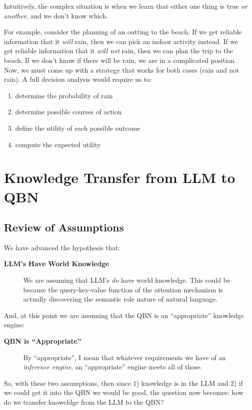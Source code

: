 \documentclass[12pt]{article}
\begin{document}
Intuitively, the complex situation is when we learn that either one thing is true {\em or another}, and we don't know which.

For example, consider the planning of an outting to the beach.
If we get reliable information that it {\em will} rain, then we can pick an indoor activity instead.
If we get reliable information that it {\em will not} rain, then we can plan the trip to the beach.
If we don't know if there will be rain, we are in a complicated position.
Now, we must come up with a strategy that works for both cases (rain and not rain).
A full decision analysis would require us to:
\begin{enumerate}
    \item determine the probability of rain
    \item determine possible courses of action
    \item define the utility of each possible outcome
    \item compute the expected utility
\end{enumerate}
\section{Knowledge Transfer from LLM to QBN}
\subsection{Review of Assumptions}
We have advanced the hypothesis that:
\begin{description}
    \item[\textbf{LLM's Have World Knowledge}] We are assuming that LLM's {\em do} have world knowledge. This could be because the query-key-value function of the attention mechanism is actually discovering the semantic role nature of natural language.
  \end{description}

And, at this point we are assuming that the QBN is an ``appropriate'' knowledge engine:
\begin{description}
    \item[\textbf{QBN is ``Appropriate''}] By ``appropriate'', I mean that whatever requirements we have of an {\em inference engine}, an ``appropriate'' engine meets all of those.
  \end{description}

So, with these two assumptions, then since 1) knowledge is in the LLM and 2) if we could get it into the QBN we would be good, the question now becomes: how do we transfer knoweldge from the LLM to the QBN?
\end{document}
